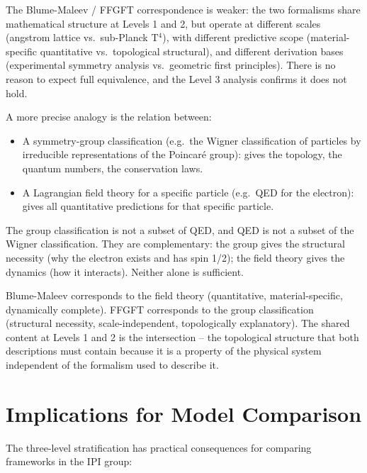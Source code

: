 The Blume-Maleev / FFGFT correspondence is weaker: the two formalisms
share mathematical structure at Levels 1 and 2, but operate at different
scales (angstrom lattice vs.\ sub-Planck T$^4$), with different predictive
scope (material-specific quantitative vs.\ topological structural), and
different derivation bases (experimental symmetry analysis vs.\ geometric
first principles). There is no reason to expect full equivalence, and the
Level 3 analysis confirms it does not hold.

A more precise analogy is the relation between:
\begin{itemize}
  \item A symmetry-group classification (e.g.\ the Wigner classification of
        particles by irreducible representations of the Poincaré group): gives
        the topology, the quantum numbers, the conservation laws.
  \item A Lagrangian field theory for a specific particle (e.g.\ QED for the
        electron): gives all quantitative predictions for that specific particle.
\end{itemize}
The group classification is not a subset of QED, and QED is not a subset of
the Wigner classification. They are complementary: the group gives the
structural necessity (why the electron exists and has spin 1/2); the field
theory gives the dynamics (how it interacts). Neither alone is sufficient.

Blume-Maleev corresponds to the field theory (quantitative, material-specific,
dynamically complete). FFGFT corresponds to the group classification (structural
necessity, scale-independent, topologically explanatory). The shared content at
Levels 1 and 2 is the intersection -- the topological structure that both
descriptions must contain because it is a property of the physical system
independent of the formalism used to describe it.

\section{Implications for Model Comparison}

The three-level stratification has practical consequences for comparing
frameworks in the IPI group:

